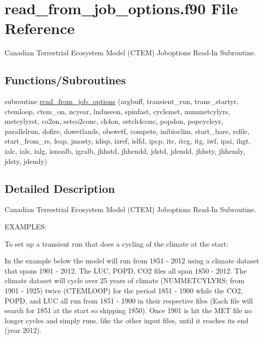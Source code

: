 \hypertarget{read__from__job__options_8f90}{}\section{read\+\_\+from\+\_\+job\+\_\+options.\+f90 File Reference}
\label{read__from__job__options_8f90}


Canadian Terrestrial Ecosystem Model (C\+T\+E\+M) Joboptions Read-\/\+In Subroutine.  


\subsection*{Functions/\+Subroutines}
\begin{DoxyCompactItemize}
\item 
subroutine \hyperlink{read__from__job__options_8f90_a4d9e6acff97bbaca36f374552dbca674}{read\+\_\+from\+\_\+job\+\_\+options} (argbuff, transient\+\_\+run, trans\+\_\+startyr, ctemloop, ctem\+\_\+on, ncyear, lnduseon, spinfast, cyclemet, nummetcylyrs, metcylyrst, co2on, setco2conc, ch4on, setch4conc, popdon, popcycleyr, parallelrun, dofire, dowetlands, obswetf, compete, inibioclim, start\+\_\+bare, rsfile, start\+\_\+from\+\_\+rs, leap, jmosty, idisp, izref, islfd, ipcp, itc, itcg, itg, iwf, ipai, ihgt, ialc, ials, ialg, isnoalb, igralb, jhhstd, jhhendd, jdstd, jdendd, jhhsty, jhhendy, jdsty, jdendy)
\end{DoxyCompactItemize}


\subsection{Detailed Description}
Canadian Terrestrial Ecosystem Model (C\+T\+E\+M) Joboptions Read-\/\+In Subroutine. 

E\+X\+A\+M\+P\+L\+E\+S\+:

To set up a transient run that does a cycling of the climate at the start\+:

In the example below the model will run from 1851 -\/ 2012 using a climate dataset that spans 1901 -\/ 2012. The L\+U\+C, P\+O\+P\+D, C\+O2 files all span 1850 -\/ 2012. The climate dataset will cycle over 25 years of climate (N\+U\+M\+M\+E\+T\+C\+Y\+L\+Y\+R\+S; from 1901 -\/ 1925) twice (C\+T\+E\+M\+L\+O\+O\+P) for the period 1851 -\/ 1900 while the C\+O2, P\+O\+P\+D, and L\+U\+C all run from 1851 -\/ 1900 in their respective files (Each file will search for 1851 at the start so skipping 1850). Once 1901 is hit the M\+E\+T file no longer cycles and simply runs, like the other input files, until it reaches its end (year 2012).

